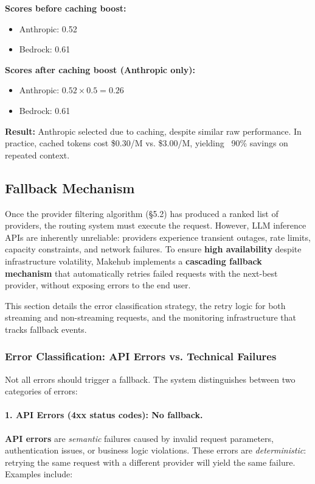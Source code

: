 \documentclass[english]{article}
\begin{document}
\textbf{Scores before caching boost:}
\begin{itemize}
    \item Anthropic: 0.52
    \item Bedrock: 0.61
\end{itemize}

\textbf{Scores after caching boost (Anthropic only):}
\begin{itemize}
    \item Anthropic: $0.52 \times 0.5 = 0.26$
    \item Bedrock: 0.61
\end{itemize}

\textbf{Result:} Anthropic selected due to caching, despite similar raw performance. In practice, cached tokens cost \$0.30/M vs. \$3.00/M, yielding ~90\% savings on repeated context.

\subsection{Fallback Mechanism}

Once the provider filtering algorithm (§5.2) has produced a ranked list of providers, the routing system must execute the request. However, LLM inference APIs are inherently unreliable: providers experience transient outages, rate limits, capacity constraints, and network failures. To ensure \textbf{high availability} despite infrastructure volatility, Makehub implements a \textbf{cascading fallback mechanism} that automatically retries failed requests with the next-best provider, without exposing errors to the end user.

This section details the error classification strategy, the retry logic for both streaming and non-streaming requests, and the monitoring infrastructure that tracks fallback events.

\subsubsection{Error Classification: API Errors vs. Technical Failures}

Not all errors should trigger a fallback. The system distinguishes between two categories of errors:

\paragraph{1. API Errors (4xx status codes): No fallback.}

\textbf{API errors} are \emph{semantic} failures caused by invalid request parameters, authentication issues, or business logic violations. These errors are \emph{deterministic}: retrying the same request with a different provider will yield the same failure. Examples include:
\end{document}

